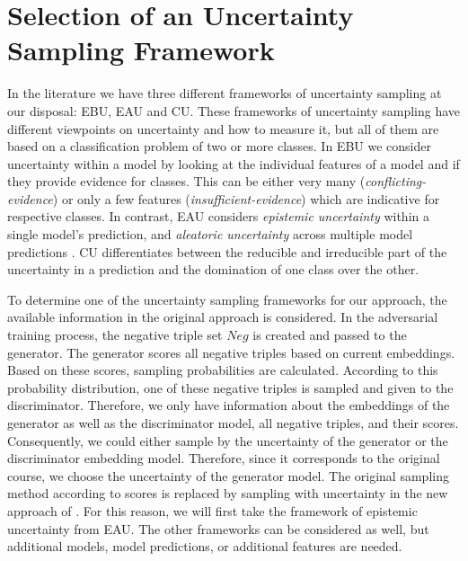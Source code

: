 \section{Selection of an Uncertainty Sampling Framework} 
\label{sec:selection_of_an_uncertainty_sampling_type}
%
In the literature we have three different frameworks of uncertainty sampling at our disposal:
\ac{EBU}, \ac{EAU} and \ac{CU}.
These frameworks of uncertainty sampling have different viewpoints on uncertainty and how to measure it, but all of them are based on a classification problem of two or more classes.
In \ac{EBU} we consider uncertainty within a model by looking at the individual features of a model and if they provide evidence for classes.
This can be either very many (\textit{conflicting-evidence}) or only a few features (\textit{insufficient-evidence}) which are indicative for respective classes.
In contrast, \ac{EAU} considers \textit{epistemic uncertainty} within a single model’s prediction, and \textit{aleatoric uncertainty} across multiple model predictions \cite{human-in-the-loop}.
\Ac{CU} differentiates between the reducible and irreducible part of the uncertainty in a prediction and the domination of one class over the other.

To determine one of the uncertainty sampling frameworks for our approach, the available information in the original \kbgan approach is considered.
In the adversarial training process, the negative triple set $Neg$ is created and passed to the generator.
The generator scores all negative triples based on current embeddings.
Based on these scores, sampling probabilities are calculated.
According to this probability distribution, one of these negative triples is sampled and given to the discriminator.
Therefore, we only have information about the embeddings of the generator as well as the discriminator model, all negative triples, and their scores.
Consequently, we could either sample by the uncertainty of the generator or the discriminator embedding model.
Therefore, since it corresponds to the original course, we choose the uncertainty of the generator model.
The original sampling method according to scores is replaced by sampling with uncertainty in the new approach of \usgan.
For this reason, we will first take the framework of epistemic uncertainty from \ac{EAU}.
The other frameworks can be considered as well, but additional models, model predictions, or additional features are needed.
%
%
%
%
